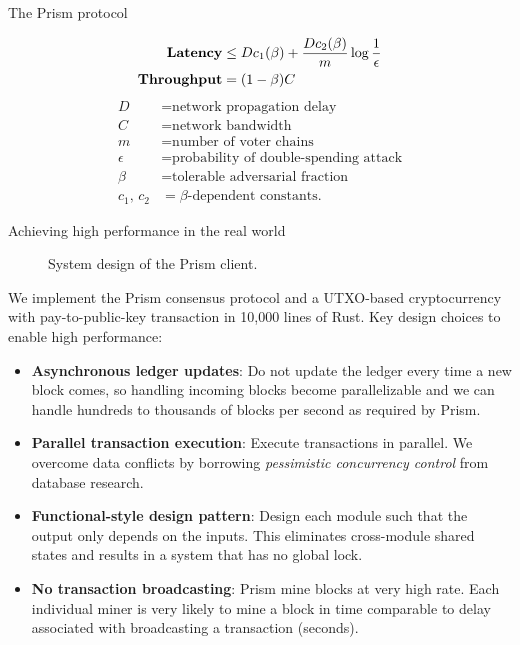 \documentclass[final]{beamer}
\newlength{\colwidth}
\begin{document}
\begin{frame}[t]
\begin{columns}[t]
\begin{column}{\colwidth}
\begin{alertblock}{The Prism protocol}
  \begin{multicols}{2}
  \begin{align*}
   \text{\textbf{Latency}} &\leq D c_1(\beta) + \frac{D c_2(\beta)}{m}\log \frac{1}{\epsilon} \\
   \text{\textbf{Throughput}} &= (1-\beta) C
  \end{align*}
  \break 
  \begin{align*}
      D &= \text{network propagation delay} \\
      C &= \text{network bandwidth} \\
      m &= \text{number of voter chains} \\
      \epsilon &= \text{probability of double-spending attack} \\
      \beta &= \text{tolerable adversarial fraction} \\
      c_1\text{, }c_2 &= \beta\text{-dependent constants.} 
  \end{align*}
  \end{multicols}
  \end{alertblock}
  
  \begin{block}{Achieving high performance in the real world}
  
  \begin{figure}
      \centering
      
      \caption{System design of the Prism client.}
        \end{figure}

      We implement the Prism consensus protocol and a UTXO-based cryptocurrency with pay-to-public-key transaction in 10,000 lines of Rust. Key design choices to enable high performance:
      
      \begin{itemize}
          \item \textbf{Asynchronous ledger updates}: Do not update the ledger every time a new block comes, so handling incoming blocks become parallelizable and we can handle hundreds to thousands of blocks per second as required by Prism.
          \item \textbf{Parallel transaction execution}: Execute transactions in parallel. We overcome data conflicts by borrowing \textit{pessimistic concurrency control} from database research. 	 
          \item \textbf{Functional-style design pattern}: Design each module such that the output only depends on the inputs. This eliminates cross-module shared states and results in a system that has no global lock.
          \item \textbf{No transaction broadcasting}: Prism mine blocks at very high rate. Each individual miner is very likely to mine a block in time comparable to delay associated with broadcasting a transaction (seconds).
      \end{itemize}
  \end{block}
    

\end{column}
\end{columns}
\end{frame}
\end{document}

